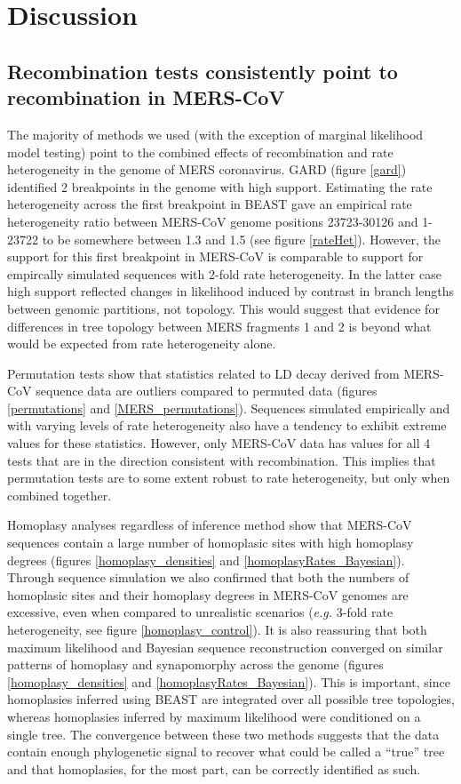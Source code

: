 \documentclass[11pt,oneside,letterpaper]{article}
\begin{document}
\section*{Discussion}
\subsection*{Recombination tests consistently point to recombination in MERS-CoV}
The majority of methods we used (with the exception of marginal likelihood model testing) point to the combined effects of recombination and rate heterogeneity in the genome of MERS coronavirus.
GARD (figure \ref{gard}) identified 2 breakpoints in the genome with high support.
Estimating the rate heterogeneity across the first breakpoint in BEAST gave an empirical rate heterogeneity ratio between MERS-CoV genome positions 23723-30126 and 1-23722 to be somewhere between 1.3 and 1.5 (see figure \ref{rateHet}).
However, the support for this first breakpoint in MERS-CoV is comparable to support for empircally simulated sequences with 2-fold rate heterogeneity.
In the latter case high support reflected changes in likelihood induced by contrast in branch lengths between genomic partitions, not topology.
This would suggest that evidence for differences in tree topology between MERS fragments 1 and 2 is beyond what would be expected from rate heterogeneity alone.

Permutation tests show that statistics related to LD decay derived from MERS-CoV sequence data are outliers compared to permuted data (figures \ref{permutations} and \ref{MERS_permutations}).
Sequences simulated empirically and with varying levels of rate heterogeneity also have a tendency to exhibit extreme values for these statistics.
However, only MERS-CoV data has values for all 4 tests that are in the direction consistent with recombination.
This implies that permutation tests are to some extent robust to rate heterogeneity, but only when combined together.

Homoplasy analyses regardless of inference method show that MERS-CoV sequences contain a large number of homoplasic sites with high homoplasy degrees (figures \ref{homoplasy_densities} and \ref{homoplasyRates_Bayesian}).
Through sequence simulation we also confirmed that both the numbers of homoplasic sites and their homoplasy degrees in MERS-CoV genomes are excessive, even when compared to unrealistic scenarios (\textit{e.g.} 3-fold rate heterogeneity, see figure \ref{homoplasy_control}).
It is also reassuring that both maximum likelihood and Bayesian sequence reconstruction converged on similar patterns of homoplasy and synapomorphy across the genome (figures \ref{homoplasy_densities} and \ref{homoplasyRates_Bayesian}).
This is important, since homoplasies inferred using BEAST are integrated over all possible tree topologies, whereas homoplasies inferred by maximum likelihood were conditioned on a single tree.
The convergence between these two methods suggests that the data contain enough phylogenetic signal to recover what could be called a ``true'' tree and that homoplasies, for the most part, can be correctly identified as such.
\end{document}
